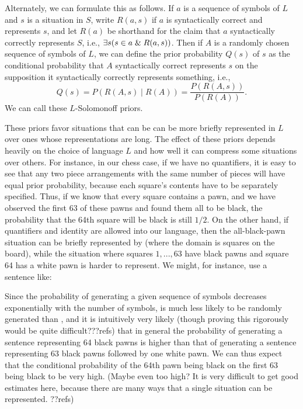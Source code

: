 Alternately, we can formulate this as follows. If $a$ is a sequence of symbols of $L$ and $s$ is a situation in $S$, write
$R(a,s)$ if $a$ is syntactically correct and represents $s$, and let $R(a)$ be shorthand for the claim that $a$ syntactically
correctly represents $S$, i.e., $\exists s(s\in a\mathrel{\&} R(a,s))$. Then if $A$ is a randomly chosen sequence of symbols of $L$,
we can define the prior probability $Q(s)$ of $s$ as the conditional probability that $A$ syntactically correct represents $s$ on the supposition
it syntactically correctly represents something, i.e.,
$$
    Q(s) = P(R(A,s)\mid R(A)) = \frac{P(R(A,s))}{P(R(A))}.
$$    
We can call these $L$-Solomonoff priors.

These priors favor situations that can be can be more briefly represented in $L$ over ones whose representations are long.
The effect of these priors depends heavily on the choice of language $L$ and how well it can compress some situations over
others. For instance, in our chess case, if we have no quantifiers, it is easy to see that any two piece arrangements with 
the same number of pieces will have equal prior probability, because each square's contents have to be separately specified. 
Thus, if we know that every square contains a pawn, and we have observed the first 63 of these pawns and found them all to be black, the 
probability that the 64th square will be black is still $1/2$. On the other hand, if quantifiers and identity are allowed into our
language, then the all-black-pawn situation can be briefly represented by
(where the domain is
squares on the board), while the situation where squares $1,...,63$ have black pawns and square 64 has a white pawn is harder
to represent. We might, for instance, use a sentence like:

Since the probability of generating a given sequence of symbols decreases exponentially with the number of symbols, 
is much less likely to be randomly generated than , and it is intuitively very likely (though proving this rigorously would
be quite difficult???refs) that in general the probability of generating a sentence representing 64 black pawns is higher than that of 
generating a sentence representing 63 black pawns followed by one white pawn. We can thus expect that the conditional probability of
the 64th pawn being black on the first 63 being black to be very high. (Maybe even too high? It is very difficult to get good
estimates here, because there are many ways that a single situation can be represented. ??refs)

